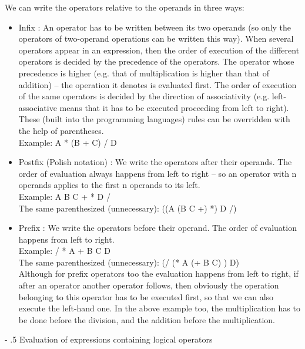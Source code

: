 \documentclass[margin=0px]{article}
\makeatletter
\renewcommand\paragraph{%
    \@startsection{paragraph}{4}{0mm}%
    {-\baselineskip}%
    {.5\baselineskip}%
    {\normalfont\normalsize\bfseries}}
\makeatother
\begin{document}
\noindent We can write the operators relative to the operands in three ways:

\begin{itemize}
    \item	Infix : An operator has to be written between its two operands (so only the operators of two-operand operations
          can be written this way).
          When several operators appear in an expression, then the order of execution of the different operators
          is decided by the precedence of the operators. The operator whose precedence is higher (e.g. that of
          multiplication is higher than that of addition) -- the operation it denotes is evaluated first. The order of execution of the same
          operators is decided by the direction of associativity (e.g. left-associative
          means that it has to be executed proceeding from left to right). These (built into the programming languages)
          rules can be overridden with the help of parentheses.\\
          Example: A * (B + C) / D

    \item	Postfix (Polish notation) : We write the operators after their operands. The order of evaluation always
          happens from left to right -- so an operator with n operands applies to the first n operands to its left.\\
          Example: A B C + * D /\\
          The same parenthesized (unnecessary): ((A (B C +) *) D /)

    \item	Prefix : We write the operators before their operand. The order of evaluation happens from left
          to right.\\
          Example: / * A + B C D\\
          The same parenthesized (unnecessary): (/ (* A (+ B C) ) D)\\
          Although for prefix operators too the evaluation happens from left to right, if after an operator
          another operator follows, then obviously the operation belonging to this operator has to be executed first,
          so that we can also execute the left-hand one. In the above example too, the
          multiplication has to be done before the division, and the addition before the multiplication.
\end{itemize}

\paragraph{Evaluation of expressions containing logical operators}
\end{document}
